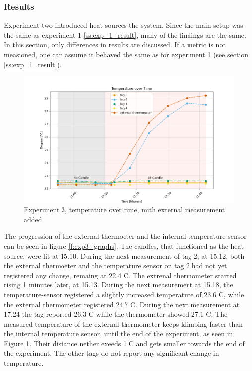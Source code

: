 \subsubsection{Results}
\label{ss:exp_2_result}
Experiment two introduced heat-sources the system.
Since the main setup was the same as experiment 1 \ref{ss:exp_1_result}, many of the findings are the same.
In this section, only differences in results are discussed.
If a metric is not measioned, one can assume it behaved the same as for experiment 1  (see section \ref{ss:exp_1_result}).

\begin{figure}[ht!]
	\includegraphics[width=\linewidth]{graphics/exp/exp3_temp_plot_1.png}
	\caption{Experiment 3, temperature over time, mith external measurement added.}
	\label{f:exp3_graphs_temp}
\end{figure}

The progression of the external thermoeter and the internal temperature sensor can be seen in figure \ref{f:exp3_graphs}.
The candles, that functioned as the heat source, were lit at 15.10.
During the next measurement of tag 2, at 15.12, both the external thermoeter and the temperature sensor on tag 2 had not yet registered any change, remaing at 22.4 \degree C.
The extrenal thermometer started rising 1 minutes later, at 15.13.
During the next measurement at 15.18, the temperature-sensor registered a slightly increased temperature of 23.6 \degree C, while the external thermometer registered 24.7 \degree C.
During the next measurement at 17.24 the tag reported 26.3 \degree C while the thermometer showed 27.1 \degree C. 
The measured temperature of the external thermometer keeps klimbing faster than the internal temperature sensor, until the end of the experiment, as seen in Figure \ref{f:exp3_graphs_temp}.
Their distance nether exeeds 1 \degree C and gets smaller towards the end of the experiment.
The other tags do not report any significant change in temperature.

